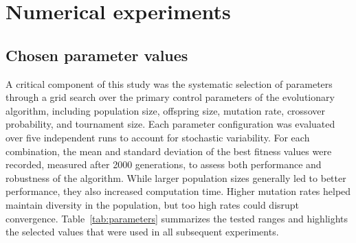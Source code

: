 \documentclass[a4paper,10pt]{article}
\newcommand{\ReplaceMe}[1]{{\color{blue}#1}}
\begin{document}
\section{Numerical experiments}

\subsection{Chosen parameter values}


A critical component of this study was the systematic selection of parameters through a grid search over the primary control parameters of the evolutionary algorithm, including population size, offspring size, mutation rate, crossover probability, and tournament size. Each parameter configuration was evaluated over five independent runs to account for stochastic variability. For each combination, the mean and standard deviation of the best fitness values were recorded, measured after 2000 generations, to assess both performance and robustness of the algorithm. While larger population sizes generally led
to better performance, they also increased computation time. Higher mutation rates helped maintain diversity in the population, but too high rates could disrupt convergence. Table~\ref{tab:parameters} summarizes the tested ranges and highlights the selected values that were used in all subsequent experiments.



\end{document}
